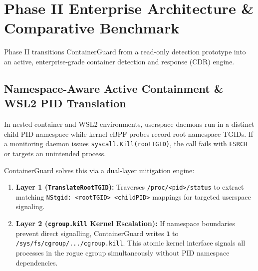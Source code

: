 \documentclass[11pt,a4paper]{article}
\begin{document}
\newpage


\section{Phase II Enterprise Architecture \& Comparative Benchmark}

Phase II transitions ContainerGuard from a read-only detection prototype into an active, enterprise-grade container detection and response (CDR) engine.

\subsection{Namespace-Aware Active Containment \& WSL2 PID Translation}
In nested container and WSL2 environments, userspace daemons run in a distinct child PID namespace while kernel eBPF probes record root-namespace TGIDs. If a monitoring daemon issues \texttt{syscall.Kill(rootTGID)}, the call fails with \texttt{ESRCH} or targets an unintended process.

ContainerGuard solves this via a dual-layer mitigation engine:
\begin{enumerate}
    \item \textbf{Layer 1 (\texttt{TranslateRootTGID}):} Traverses \texttt{/proc/<pid>/status} to extract matching \texttt{NStgid: <rootTGID> <childPID>} mappings for targeted userspace signaling.
    \item \textbf{Layer 2 (\texttt{cgroup.kill} Kernel Escalation):} If namespace boundaries prevent direct signalling, ContainerGuard writes \texttt{1} to \texttt{/sys/fs/cgroup/.../cgroup.kill}. This atomic kernel interface signals all processes in the rogue cgroup simultaneously without PID namespace dependencies.
\end{enumerate}
\end{document}

